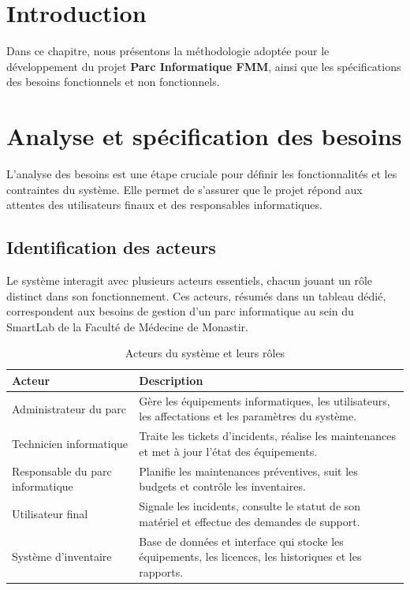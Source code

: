 \vspace{1cm}
\label{chap:methodologie}
\setcounter{chapter}{2}
\setcounter{section}{0}

\localtableofcontents
\newpage
\pagebreak
\section*{Introduction}
\label{sec:intro_methodologie}
Dans ce chapitre, nous présentons la méthodologie adoptée pour le développement du projet \textbf{Parc Informatique FMM}, ainsi que les spécifications des besoins fonctionnels et non fonctionnels.

\section{Analyse et spécification des besoins}
\label{sec:besoins_sprint1}
L’analyse des besoins est une étape cruciale pour définir les fonctionnalités et les contraintes du système. Elle permet de s’assurer que le projet répond aux attentes des utilisateurs finaux et des responsables informatiques.

\subsection{Identification des acteurs}
\label{subsec:acteurs}

Le système interagit avec plusieurs acteurs essentiels, chacun jouant un rôle distinct dans son fonctionnement. Ces acteurs, résumés dans un tableau dédié, correspondent aux besoins de gestion d’un parc informatique au sein du SmartLab de la Faculté de Médecine de Monastir.

\begin{table}[H]
\centering
\caption{Acteurs du système et leurs rôles}
\label{tab:acteurs}
\begin{tabular}{|p{3cm}|p{9cm}|}
\hline
\textbf{Acteur} & \textbf{Description} \\
\hline
Administrateur du parc & Gère les équipements informatiques, les utilisateurs, les affectations et les paramètres du système. \\
\hline
Technicien informatique & Traite les tickets d’incidents, réalise les maintenances et met à jour l’état des équipements. \\
\hline
Responsable du parc informatique & Planifie les maintenances préventives, suit les budgets et contrôle les inventaires. \\
\hline
Utilisateur final & Signale les incidents, consulte le statut de son matériel et effectue des demandes de support. \\
\hline
Système d’inventaire & Base de données et interface qui stocke les équipements, les licences, les historiques et les rapports. \\
\hline
\end{tabular}
\end{table}

